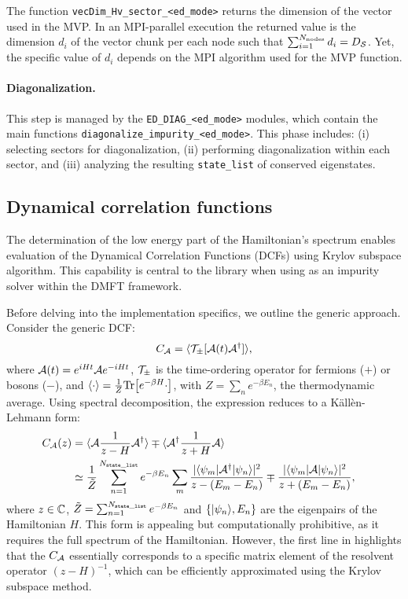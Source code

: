 \documentclass[edipack_sp.tex]{subfiles}
\begin{document}
The function {\tt vecDim\_Hv\_sector\_<ed\_mode>} returns the 
dimension of the vector used in the
MVP. In an MPI-parallel execution the returned value is the
dimension $d_i$ of the vector chunk per each node such that
$\sum_{i=1}^{N_\mathrm{nodes}}d_i = D_\SS$. Yet, the specific value of $d_i$
depends on the MPI algorithm used for the MVP function.

\paragraph{\bf Diagonalization.}
This step is managed by the {\tt ED\_DIAG\_<ed\_mode>}
modules, which contain the main functions {\tt diagonalize\_impurity\_<ed\_mode>}.
This phase includes: (i) selecting sectors for diagonalization, (ii)
performing diagonalization within each sector, and (iii) analyzing
the resulting {\tt state\_list} of conserved eigenstates.




\subsection{Dynamical correlation functions}\label{sSecGF}
The determination of the low energy part of the Hamiltonian's spectrum
enables evaluation of the Dynamical Correlation Functions (DCFs) using Krylov subspace algorithm.
This capability is central to the library when using \NAME as an
impurity solver within the DMFT framework.

Before delving into the implementation specifics, we outline the
generic approach. Consider the generic DCF:
\begin{equation}
  \label{eqGaa}
  C_\AA = \ibra \TT_\pm[ \AA(t) \AA^\dagger ]\iket,
\end{equation}
where $\AA(t)=e^{iHt}\AA e^{-iHt}$, $\TT_\pm$ is the time-ordering
operator for fermions ($+$) or
bosons ($-$), and $\ibra \cdot \iket=\frac{1}{Z}\Tr{ \left[ e^{-\beta
      H}\cdot \right]}$, with $Z=\sum_n e^{-\beta E_n}$, the thermodynamic
average.
Using spectral decomposition, the expression  reduces to a
K\"all\`en-Lehmann form:
\begin{equation}\label{KLgf}
  \begin{split}
    C_\AA(z) 
    &=  \ibra \AA \frac{1}{z-H} \AA^\dagger\iket
    \mp \ibra \AA^\dagger \frac{1}{z+H} \AA\iket \cr
    & \simeq \frac{1}{\tilde{Z}}\sum_{n=1}^{N_{\tt state\_list}} e^{-\beta E_n}\sum_m
  \frac{ |\bra{\psi_m}\AA^\dagger \ket{\psi_n}|^2 }  {z-(E_m-E_n)}
  \mp
  \frac{ |\bra{\psi_m}\AA \ket{\psi_n}|^2 }  {z+(E_m-E_n)},\cr
\end{split}
\end{equation}
where $z\in\CCC$, $\tilde{Z}=\sum_{n=1}^{N_{\tt state\_list}} e^{-\beta E_n}$ and $\{\ket{\psi_n}, E_n\}$ are the eigenpairs of the
Hamiltonian $H$. 
This form is appealing but computationally prohibitive, as it requires
the full spectrum of the Hamiltonian. However, the first line in 
highlights that the $C_\AA$ essentially corresponds to a specific
matrix element of the resolvent operator $(z-H)^{-1}$, which can be
efficiently approximated using the Krylov subspace method.
\end{document}
